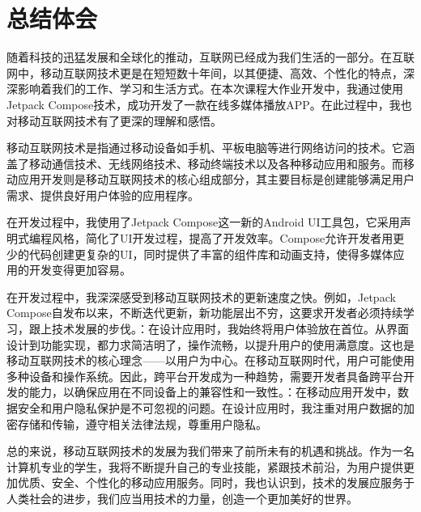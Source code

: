 \documentclass[main.tex]{subfiles}
\begin{document}
\section{总结体会}


随着科技的迅猛发展和全球化的推动，互联网已经成为我们生活的一部分。在互联网中，移动互联网技术更是在短短数十年间，以其便捷、高效、个性化的特点，深深影响着我们的工作、学习和生活方式。在本次课程大作业开发中，我通过使用Jetpack Compose技术，成功开发了一款在线多媒体播放APP。在此过程中，我也对移动互联网技术有了更深的理解和感悟。

移动互联网技术是指通过移动设备如手机、平板电脑等进行网络访问的技术。它涵盖了移动通信技术、无线网络技术、移动终端技术以及各种移动应用和服务。而移动应用开发则是移动互联网技术的核心组成部分，其主要目标是创建能够满足用户需求、提供良好用户体验的应用程序。

在开发过程中，我使用了Jetpack Compose这一新的Android UI工具包，它采用声明式编程风格，简化了UI开发过程，提高了开发效率。Compose允许开发者用更少的代码创建更复杂的UI，同时提供了丰富的组件库和动画支持，使得多媒体应用的开发变得更加容易。

在开发过程中，我深深感受到移动互联网技术的更新速度之快。例如，Jetpack Compose自发布以来，不断迭代更新，新功能层出不穷，这要求开发者必须持续学习，跟上技术发展的步伐。：在设计应用时，我始终将用户体验放在首位。从界面设计到功能实现，都力求简洁明了，操作流畅，以提升用户的使用满意度。这也是移动互联网技术的核心理念——以用户为中心。在移动互联网时代，用户可能使用多种设备和操作系统。因此，跨平台开发成为一种趋势，需要开发者具备跨平台开发的能力，以确保应用在不同设备上的兼容性和一致性。：在移动应用开发中，数据安全和用户隐私保护是不可忽视的问题。在设计应用时，我注重对用户数据的加密存储和传输，遵守相关法律法规，尊重用户隐私。

总的来说，移动互联网技术的发展为我们带来了前所未有的机遇和挑战。作为一名计算机专业的学生，我将不断提升自己的专业技能，紧跟技术前沿，为用户提供更加优质、安全、个性化的移动应用服务。同时，我也认识到，技术的发展应服务于人类社会的进步，我们应当用技术的力量，创造一个更加美好的世界。
\end{document}
